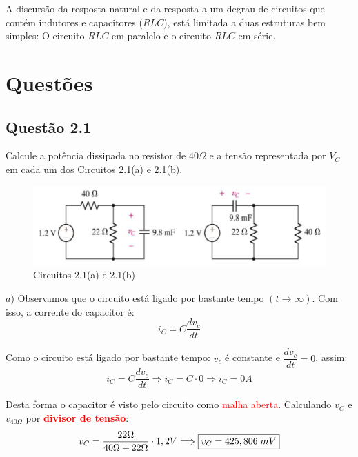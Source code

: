 \documentclass[
	12pt,				%
	oneside,			%
	a4paper,			%
	english,			%
	french,				%
	spanish,			%
	brazil				%
	]{abntex2}
\begin{document}
A discursão da resposta natural e da resposta a um degrau de circuitos que contém indutores e capacitores ($RLC$), está limitada a duas estruturas bem simples: O circuito $RLC$ em paralelo e o circuito $RLC$ em série.
\cite{nilssonriedel}
\chapter{Questões}


\section*{Questão 2.1}
Calcule a potência dissipada no resistor de $40\Omega$ e a tensão representada por $V_C$ em cada um dos Circuitos 2.1(a) e 2.1(b).
\begin{figure}[htb]
	\centering
	\includegraphics[scale=0.5]{2-1.PNG}
	\caption{Circuitos 2.1(a) e 2.1(b)}
\end{figure}

$a)$ Observamos que o circuito está ligado por bastante tempo $(t\rightarrow \infty)$. Com isso, a corrente do capacitor é:
$$i_C = C\dfrac{d v_c}{dt}$$

Como o circuito está ligado por bastante tempo: $v_c$ é constante e $\dfrac{d v_c}{dt} = 0$, assim:
$$i_C = C\dfrac{d v_c}{dt} \Longrightarrow i_C = C \cdot 0 \Longrightarrow i_C=0A$$

Desta forma o capacitor é visto pelo circuito como \textcolor{red}{malha aberta}. Calculando $v_C$ e $v_{40\Omega}$ por \textbf{\textcolor{red}{divisor de tensão}}:
\begin{equation}
    \centering
    v_C = \dfrac{22\Omega}{40\Omega + 22\Omega} \cdot 1,2V \Longrightarrow \fbox{$v_C = 425,806\;mV$} 
\end{equation}
\end{document}
